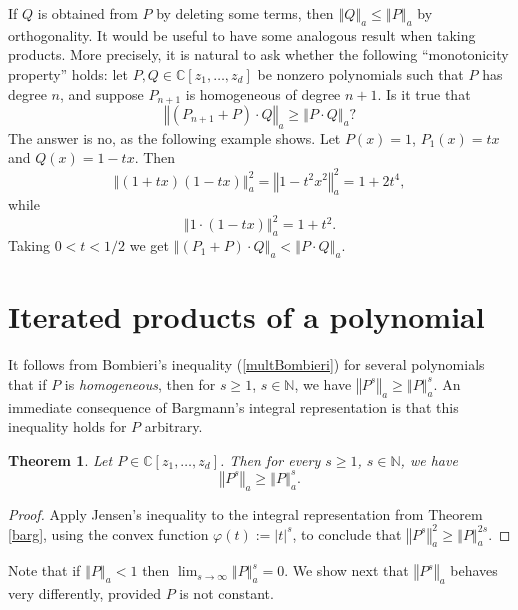\documentclass[12pt]{amsart}
\newtheorem{theorem}{Theorem}
\newcommand{\N}{\mathbb{N}}
\begin{document}
If $Q$ is obtained from $P$ by deleting some terms, then $
\left\Vert Q  \right\Vert _{a}
\le
\left\Vert P  \right\Vert _{a}
$ by orthogonality.
It would be useful to have some analogous result when taking products. More
precisely, it is natural to ask whether the following ``monotonicity property'' holds:
let $P , Q  \in \mathbb{C}[z_{1},\dots,z_{d}]$ be nonzero 
polynomials such that $P$ has degree $n$, and suppose $P_{n + 1}$ is homogeneous of degree $n + 1$. Is it true that 
\[
\left\Vert (P_{n + 1} + P) \cdot Q \right\Vert _{a}
\ge
\left\Vert  P \cdot Q \right\Vert _{a}?
\]
The answer is no, as the following example shows.
Let $P (x)= 1$, $P_1(x) = tx$ and $Q(x) = 1 - tx$. Then
\[
\left\Vert \left(  1 + tx \right)  \left(  1 - tx \right)  \right\Vert _{a}^{2}
=
\left\Vert 1 - t^{2} x^{2}\right\Vert _{a}^{2}
=
1 + 2 t^4,
\]
while
\[
\left\Vert   1\cdot  \left(  1 - tx \right)  \right\Vert _{a}^{2}
=
1 + t^2.
\]
Taking $0 < t < 1/2$ we get $
\left\Vert (P_{1} + P) \cdot Q \right\Vert _{a}
<
\left\Vert  P \cdot Q \right\Vert _{a}.$



\section{Iterated products of a polynomial}


It follows from Bombieri's  inequality (\ref{multBombieri}) for several polynomials that if $P$ is 
\emph{homogeneous}, then for	$s\geq1$, $s\in \N$, we have
$
\left\Vert P^{s}\right\Vert _{a}\geq\left\Vert P\right\Vert _{a}^{s}.
$
An immediate consequence of Bargmann's integral representation is that this inequality holds for $P$ arbitrary.

\begin{theorem} \label{BombieriJensen2}
	Let $P  \in \mathbb{C}[z_{1},\dots,z_{d}]$. Then for every $s\geq1$, $s\in \N$, we have
	\[
	\left\Vert P^{ s}  \right\Vert _{a}
	\ge
	\left\Vert P \right\Vert _{a}^{ s}.
	\]		
\end{theorem}

\begin{proof} Apply Jensen's inequality to the integral representation from Theorem  \ref{barg}, using the convex function $\varphi (t) := |t|^s$, to conclude that $
	\left\Vert P^{ s}  \right\Vert _{a}^2
	\ge
	\left\Vert P \right\Vert _{a}^{2 s}.$
\end{proof}


Note that if $
\left\Vert P\right\Vert _{a} < 1$ then $\lim_{s\to \infty} \left\Vert P \right\Vert _{a}^{s} = 0$.  We show next that $
\left\Vert P^{ s}  \right\Vert _{a}
$ behaves very differently, provided $P$ is not constant.  
\end{document}
